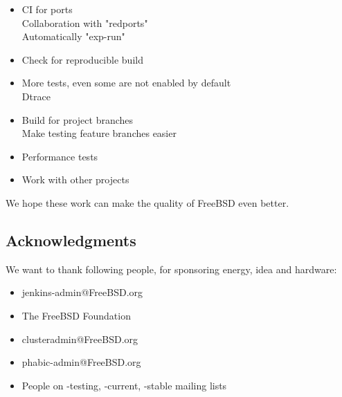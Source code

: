 \documentclass[a4paper,twocolumn,10pt]{article}
\begin{document}
\begin{itemize}
\item CI for ports\\
  Collaboration with "redports"\\
  Automatically "exp-run"
\item Check for reproducible build
\item More tests, even some are not enabled by default\\
Dtrace
\item Build for project branches\\
Make testing feature branches easier
\item Performance tests
\item Work with other projects
\end{itemize}

We hope these work can make the quality of FreeBSD even better.

\subsection*{Acknowledgments}

We want to thank following people, for sponsoring energy, idea and hardware:

\begin{itemize}
\item jenkins-admin@FreeBSD.org
\item The FreeBSD Foundation
\item clusteradmin@FreeBSD.org
\item phabic-admin@FreeBSD.org
\item People on -testing, -current, -stable mailing lists
\end{itemize}

{\footnotesize 
}
\end{document}
